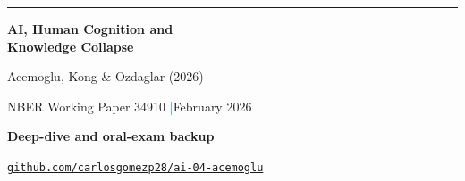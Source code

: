 \documentclass[aspectratio=169,10pt]{beamer}
\begin{document}
\begin{frame}[plain]
  \vspace{.7cm}
  {\color{Teal}\rule{1.8cm}{3pt}}\par
  \vspace{.4cm}
  {\color{Navy}\fontsize{25}{29}\selectfont\bfseries
    AI, Human Cognition and\\ Knowledge Collapse\par}
  \vspace{.3cm}
  {\large Acemoglu, Kong \& Ozdaglar (2026)}\par
  \vspace{.5cm}
  NBER Working Paper 34910 \enspace\textcolor{Teal}{|}\enspace February 2026\par
  \vspace{.3cm}
  {\color{Gold}\bfseries Deep-dive and oral-exam backup}\par
  \vfill
  \href{https://github.com/carlosgomezp28/ai-04-acemoglu}{%
    \color{Teal}\texttt{github.com/carlosgomezp28/ai-04-acemoglu}}
  \vspace{.35cm}
\end{frame}
\end{document}
